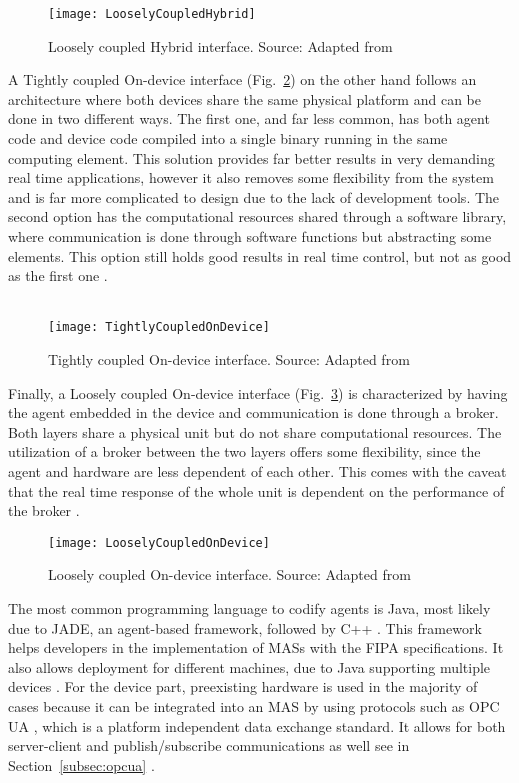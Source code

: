 \begin{figure}[hbt!]
	\centering
	\texttt{[image: LooselyCoupledHybrid]}
	\caption{Loosely coupled Hybrid interface. Source: Adapted from \cite{8591641}}
	\label{fig:loosely_coupled_hybrid}
\end{figure}

A Tightly coupled On-device interface (Fig.~\ref{fig:tightly_coupled_ondevice}) on the other hand follows an architecture where both devices share the same physical platform and can be done in two different ways. The first one, and far less common, has both agent code and device code compiled into a single binary running in the same computing element. This solution provides far better results in very demanding real time applications, however it also removes some flexibility from the system and is far more complicated to design due to the lack of development tools. The second option has the computational resources shared through a software library, where communication is done through software functions but abstracting some elements. This option still holds good results in real time control, but not as good as the first one \cite{8591641}.\\\\

\begin{figure}[hbt!]
	\centering
	\texttt{[image: TightlyCoupledOnDevice]}
	\caption{Tightly coupled On-device interface. Source: Adapted from \cite{8591641}}
	\label{fig:tightly_coupled_ondevice}
\end{figure}

Finally, a Loosely coupled On-device interface (Fig.~\ref{fig:loosely_coupled_ondevice}) is characterized by having the agent embedded in the device and communication is done through a broker. Both layers share a physical unit but do not share computational resources. The utilization of a broker between the two layers offers some flexibility, since the agent and hardware are less dependent of each other. This comes with the caveat that the real time response of the whole unit is dependent on the performance of the broker \cite{8591641}.\\

\begin{figure}[hbt!]
	\centering
	\texttt{[image: LooselyCoupledOnDevice]}
	\caption{Loosely coupled On-device interface. Source: Adapted from \cite{8591641}}
	\label{fig:loosely_coupled_ondevice}
\end{figure}

The most common programming language to codify agents is Java, most likely due to JADE, an agent-based framework, followed by C++ \cite{8591641}. This framework helps developers in the implementation of MASs  with the FIPA specifications. It also allows deployment for different machines, due to Java supporting multiple devices \cite{JADE_website}.
For the device part, preexisting hardware is used in the majority of cases because it can be integrated into an MAS by using protocols such as OPC UA \cite{8591641}, which is a platform independent data exchange standard. It allows for both server-client and publish/subscribe communications as well see in Section~\ref{subsec:opcua} \cite{OPCUA_website}.

